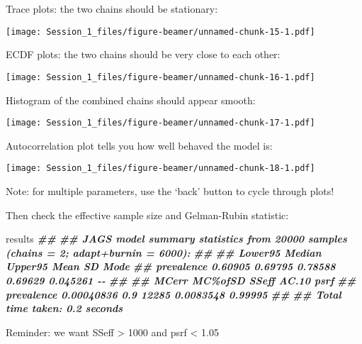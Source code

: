 \documentclass[
  ignorenonframetext,
  aspectratio=169,
]{beamer}
\newenvironment{Shaded}{\begin{snugshade}}{\end{snugshade}}
\newcommand{\DocumentationTok}[1]{\textcolor[rgb]{0.56,0.35,0.01}{\textbf{\textit{#1}}}}
\newcommand{\NormalTok}[1]{#1}
\begin{document}
\begin{frame}
Trace plots: the two chains should be stationary:

\scriptsize\texttt{[image: Session\_1\_files/figure-beamer/unnamed-chunk-15-1.pdf]}
\normalsize
\end{frame}

\begin{frame}
ECDF plots: the two chains should be very close to each other:

\scriptsize\texttt{[image: Session\_1\_files/figure-beamer/unnamed-chunk-16-1.pdf]}
\normalsize
\end{frame}

\begin{frame}
Histogram of the combined chains should appear smooth:

\scriptsize\texttt{[image: Session\_1\_files/figure-beamer/unnamed-chunk-17-1.pdf]}
\normalsize
\end{frame}

\begin{frame}
Autocorrelation plot tells you how well behaved the model is:

\scriptsize\texttt{[image: Session\_1\_files/figure-beamer/unnamed-chunk-18-1.pdf]}
\normalsize
\end{frame}

\begin{frame}[fragile]
Note: for multiple parameters, use the `back' button to cycle through
plots!

\pause

Then check the effective sample size and Gelman-Rubin statistic:

\scriptsize

\begin{Shaded}
\begin{Highlighting}[]
\NormalTok{results}
\DocumentationTok{\#\# }
\DocumentationTok{\#\# JAGS model summary statistics from 20000 samples (chains = 2; adapt+burnin = 6000):}
\DocumentationTok{\#\#                                                         }
\DocumentationTok{\#\#            Lower95  Median Upper95    Mean       SD Mode}
\DocumentationTok{\#\# prevalence 0.60905 0.69795 0.78588 0.69629 0.045261   {-}{-}}
\DocumentationTok{\#\#                                                      }
\DocumentationTok{\#\#                 MCerr MC\%ofSD SSeff     AC.10    psrf}
\DocumentationTok{\#\# prevalence 0.00040836     0.9 12285 0.0083548 0.99995}
\DocumentationTok{\#\# }
\DocumentationTok{\#\# Total time taken: 0.2 seconds}
\end{Highlighting}
\end{Shaded}

\normalsize

Reminder: we want SSeff \textgreater{} 1000 and psrf \textless{} 1.05
\end{frame}
\end{document}

